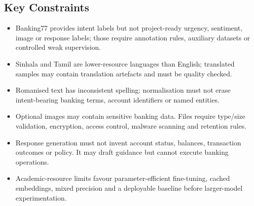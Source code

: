 \documentclass[10pt,letterpaper]{article}
\begin{document}
\subsection*{Key Constraints}
\begin{itemize}
  \item Banking77 provides intent labels but not project-ready urgency, sentiment, image or response labels; those require annotation rules, auxiliary datasets or controlled weak supervision.
  \item Sinhala and Tamil are lower-resource languages than English; translated samples may contain translation artefacts and must be quality checked.
  \item Romanised text has inconsistent spelling; normalisation must not erase intent-bearing banking terms, account identifiers or named entities.
  \item Optional images may contain sensitive banking data. Files require type/size validation, encryption, access control, malware scanning and retention rules.
  \item Response generation must not invent account status, balances, transaction outcomes or policy. It may draft guidance but cannot execute banking operations.
  \item Academic-resource limits favour parameter-efficient fine-tuning, cached embeddings, mixed precision and a deployable baseline before larger-model experimentation.
\end{itemize}
\end{document}
